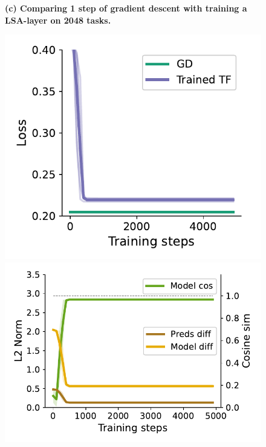\documentclass{article}
\theoremstyle{plain}
\theoremstyle{definition}
\theoremstyle{remark}
\begin{document}
\begin{figure}
\textbf{(c) Comparing 1 step of gradient descent with training a LSA-layer on 2048 tasks.}

\begin{center}
\begin{minipage}{.24\textwidth}
  \centering
  \begin{center}
    \includegraphics[width=1.\textwidth]{Final_figures/cycle/2048/train.pdf}
  \end{center}
  \vspace{-10pt}
\end{minipage}
\begin{minipage}{.24\textwidth}
  \centering
  \begin{center}
    \includegraphics[width=1.\textwidth]{Final_figures/cycle/2048/sim.pdf}

\end{center}
\end{minipage}
\end{center}
\end{figure}
\end{document}
